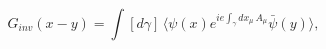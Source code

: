 \begin{equation}
G_{inv}(x-y)=\int [d\gamma]\, \langle \psi(x)e^{ie\int_\gamma dx_\mu\, A_\mu} \bar{\psi}(y) \rangle,
\label{gammaintegration}
\end{equation}

